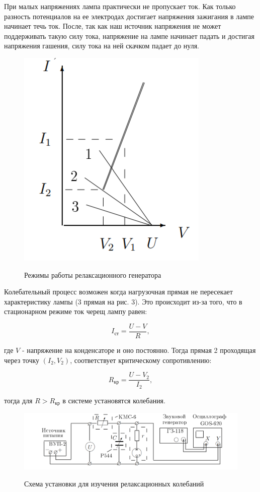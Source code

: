 \documentclass[11pt]{article}
\begin{document}
При малых напряжениях лампа практически не пропускает ток. Как только разность потенциалов на ее электродах достигает напряжения зажигания в лампе начинает течь ток. После, так как наш источник напряжения не может поддерживать такую силу тока, напряжение на лампе начинает падать и достигая напряжения гашения, силу тока на ней скачком падает до нуля.

\begin{figure}[h!]
\centering
\includegraphics[scale=0.8]{Image3.png}
\label{fig:Image1}
\caption{Режимы работы релаксационного генератора}
\end{figure}

Колебательный процесс возможен когда нагрузочная прямая не пересекает характеристику лампы (3 прямая на рис. 3). Это происходит из-за того, что в стационарном режиме ток черещ лампу равен:

\[I_{\textit{ст}} = \frac{U - V}{R},\]

где $V$ - напряжение на конденсаторе и оно постоянно. Тогда прямая 2 проходящая через точку $(I_2, V_2)$, соответствует критическому сопротивлению:

\[R_{\textit{кр}} = \frac{U - V_2}{I_2},\]

тогда для $R > R_{\textit{кр}}$ в системе установятся колебания.

\begin{figure}[h!]
\centering
\includegraphics[scale=0.8]{Image2.png}
\label{fig:Image1}
\caption{Схема установки для изучения релаксационных колебаний}
\end{figure}
\end{document}
